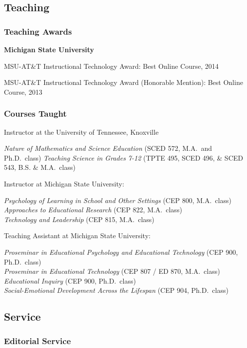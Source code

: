 \documentclass[14,]{article}
\begin{document}
\subsection{Teaching}\label{teaching}

\subsubsection{Teaching Awards}\label{teaching-awards}

\textbf{Michigan State University}

MSU-AT\&T Instructional Technology Award: Best Online Course, 2014

MSU-AT\&T Instructional Technology Award (Honorable Mention): Best
Online Course, 2013

\subsubsection{Courses Taught}\label{courses-taught}

Instructor at the University of Tennessee, Knoxville

\emph{Nature of Mathematics and Science Education} (SCED 572, M.A.~and
Ph.D.~class) \emph{Teaching Science in Grades 7-12} (TPTE 495, SCED 496,
\& SCED 543, B.S. \& M.A.~class)

Instructor at Michigan State University:

\emph{Psychology of Learning in School and Other Settings} (CEP 800,
M.A.~class)\\
\emph{Approaches to Educational Research} (CEP 822, M.A.~class)\\
\emph{Technology and Leadership} (CEP 815, M.A.~class)

Teaching Assistant at Michigan State University:

\emph{Proseminar in Educational Psychology and Educational Technology}
(CEP 900, Ph.D.~class)\\
\emph{Proseminar in Educational Technology} (CEP 807 / ED 870,
M.A.~class)\\
\emph{Educational Inquiry} (CEP 900, Ph.D.~class)\\
\emph{Social-Emotional Development Across the Lifespan} (CEP 904,
Ph.D.~class)

\subsection{Service}\label{service}

\subsubsection{Editorial Service}\label{editorial-service}
\end{document}
